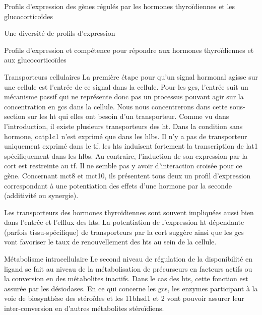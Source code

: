 \documentclass[../main.tex]{subfiles}
\begin{document}
\begin{chapter}{Profils d'expression des gènes régulés par les hormones thyroïdiennes et les glucocorticoïdes}
\begin{section}{Une diversité de profils d'expression}
\begin{subsection}{Profils d'expression et compétence pour répondre aux hormones thyroïdiennes et aux glucocorticoïdes}
\begin{subsubsection}{Transporteurs cellulaires}
La première étape pour qu'un signal hormonal agisse sur une cellule est l'entrée de ce signal dans la cellule.
Pour les \glspl{gc}, l'entrée suit un mécanisme passif qui ne représente donc pas un processus pouvant agir sur la concentration en \glspl{gc} dans la cellule.
Nous nous concentrerons dans cette sous-section sur les \gls{ht} qui elles ont besoin d'un transporteur.
Comme vu dans l'introduction, il existe plusieurs transporteurs des \gls{ht}.
Dans la condition sans hormone, \gls{oatp}1c1 n'est exprimé que dans les \glspl{hlb}.
Il n'y a pas de transporteur uniquement exprimé dans le \gls{tf}.
les \glspl{ht} induisent fortement la transcription de \gls{lat}1 spécifiquement dans les \glspl{hlb}.
Au contraire, l'induction de son expression par la \gls{cort} est restreinte au \gls{tf}.
Il ne semble pas y avoir d'interaction croisée pour ce gène.
Concernant \gls{mct}8 et \gls{mct}10, ils présentent tous deux un profil d'expression correspondant à une potentiation des effets d'une hormone par la seconde (additivité ou synergie).
\par
Les transporteurs des hormones thyroïdiennes sont souvent impliquées aussi bien dans l'entrée et l'efflux des \glspl{ht}.
La potentiation de l'expression \gls{ht}-dépendante (parfois tissu-spécifique) de transporteurs par la \gls{cort} suggère ainsi que les \glspl{gc} vont favoriser le taux de renouvellement des \glspl{ht} au sein de la cellule.
\end{subsubsection}

\begin{subsubsection}{Métabolisme intracellulaire}
Le second niveau de régulation de la disponibilité en ligand se fait au niveau de la métabolisation de précurseurs en facteurs actifs ou la conversion en des métabolites inactifs.
Dans le cas des \glspl{ht}, cette fonction est assurée par les désiodases.
En ce qui concerne les \glspl{gc}, les enzymes participant à la voie de biosynthèse des stéroïdes et les \gls{11bhsd1} et 2 vont pouvoir assurer leur inter-conversion en d'autres métabolites stéroïdiens.


\end{subsubsection}
\end{subsection}
\end{section}
\end{chapter}
\end{document}

